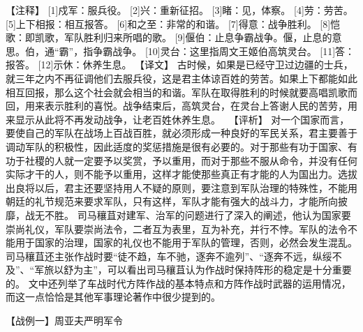 \documentclass[a4paper,12pt,UTF8,twoside]{ctexbook}
\begin{document}
【注释】
[1]戍军：服兵役。
[2]兴：重新征招。
[3]睹：见，体察。
[4]劳：劳苦。
[5]上下相报：相互报答。
[6]和之至：非常的和谐。
[7]得意：战争胜利。
[8]恺歌：即凯歌，军队胜利归来所唱的歌。
[9]偃伯：止息争霸战争。偃，止息的意思。伯，通“霸”，指争霸战争。
[10]灵台：这里指周文王姬伯高筑灵台。
[11]答：报答。
[12]示休：休养生息。
【译文】
古时候，如果是已经守卫过边疆的士兵，就三年之内不再征调他们去服兵役，这是君主体谅百姓的劳苦。如果上下都能如此相互回报，那么这个社会就会相当的和谐。军队在取得胜利的时候就要高唱凯歌而回，用来表示胜利的喜悦。战争结束后，高筑灵台，在灵台上答谢人民的苦劳，用来显示从此将不再发动战争，让老百姓休养生息。
　【评析】
对一个国家而言，要使自己的军队在战场上百战百胜，就必须形成一种良好的军民关系，君主要善于调动军队的积极性，因此适度的奖惩措施是很有必要的。对于那些有功于国家、有功于社稷的人就一定要予以奖赏，予以重用，而对于那些不服从命令，并没有任何实际才干的人，则不能予以重用，这样才能使那些真正有才能的人为国出力。选拔出良将以后，君主还要坚持用人不疑的原则，要注意到军队治理的特殊性，不能用朝廷的礼节规范来要求军队，只有这样，军队才能有强大的战斗力，才能所向披靡，战无不胜。
司马穰苴对建军、治军的问题进行了深入的阐述，他认为国家要崇尚礼仪，军队要崇尚法令，二者互为表里，互为补充，并行不悖。军队的法令不能用于国家的治理，国家的礼仪也不能用于军队的管理，否则，必然会发生混乱。
司马穰苴还主张作战时要“徒不趋，车不驰，逐奔不逾列”、“逐奔不远，纵绥不及”、“军旅以舒为主”，可以看出司马穰苴认为作战时保持阵形的稳定是十分重要的。
文中还列举了车战时代方阵作战的基本特点和方阵作战时武器的运用情况，而这一点恰恰是其他军事理论著作中很少提到的。


【战例一】周亚夫严明军令
\end{document}

